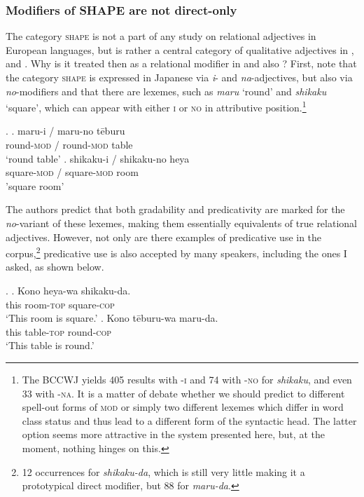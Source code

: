\documentclass [output=book,colorlinks,citecolor=brown]{langscibook}
\begin{document}
\subsubsection{Modifiers of SHAPE are not direct-only}

The category \textsc{shape} is not a part of any study on relational adjectives in European languages, but is rather a central category of qualitative adjectives in \citet{sproat:1991:the, cinque:1993:evidence, cinque:2010:adj}, \citet{scott:2002:stacked} and \citet{laenzlinger:2005:french, laenzlinger:2011:elements}. Why is it treated then as a relational modifier in \citet{nagano:2016:are} and also \citet{morita:2010:internal, morita:2011:three}? First, note that the category \textsc{shape} is expressed in Japanese via \textit{i}- and \textit{na}-adjectives, but also via \textit{no}-modifiers and that there are lexemes, such as \textit{maru} `round' and \textit{shikaku} `square’, which can appear with either \textsc{i} or \textsc{no} in attributive position.\footnote{The BCCWJ yields 405 results with -\textsc{i} and 74 with -\textsc{no} for \textit{shikaku}, and even 33 with -\textsc{na}. It is a matter of debate whether we should predict to different spell-out forms of \textsc{mod} or simply two different lexemes which differ in word class status and thus lead to a different form of the syntactic head. The latter option seems more attractive in the system presented here, but, at the moment, nothing hinges on this.} %


\ex. \ag. maru-i / maru-no tēburu\\
round-\textsc{mod} / round-\textsc{mod} table\\
`round table'
\bg. shikaku-i / shikaku-no heya\\
square-\textsc{mod} / square-\textsc{mod} room\\
'square room'

The authors predict that both gradability and predicativity are marked for the \textit{no}-variant of these lexemes, making them essentially equivalents of true relational adjectives. However, not only are there examples of predicative use in the corpus,\footnote{12 occurrences for \textit{shikaku-da}, which is still very little making it a prototypical direct modifier, but 88 for \textit{maru-da}.} predicative use is also accepted by many speakers, including the ones I asked, as shown below.

\ex. \ag. Kono heya-wa shikaku-da.\\
this room-\textsc{top} square-\textsc{cop}\\
`This room is square.’
\bg. Kono tēburu-wa maru-da.\\
this table-\textsc{top} round-\textsc{cop}\\
`This table is round.’
\end{document}
